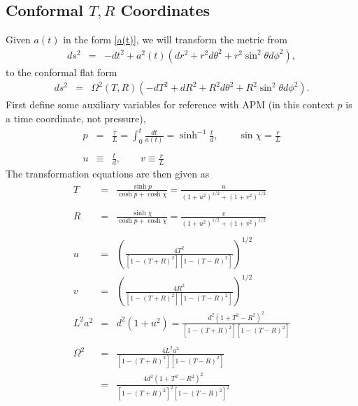 \documentclass[10pt,letterpaper]{article}
\numberwithin{equation}{section}
\begin{document}
\subsection{Conformal $T, R$ Coordinates}
Given $a(t)$ in the form \eqref{a(t)}, we will transform the metric from
\begin{eqnarray}
ds^2&=& -dt^2 + a^2(t)( dr^2 + r^2d\theta^2 + r^2\sin^2\theta d\phi^2),
\end{eqnarray}
to the conformal flat form
\begin{eqnarray}
ds^2&=& \Omega^2(T,R)( -dT^2+dR^2 + R^2d\theta^2 +R^2\sin^2\theta d\phi^2).
\end{eqnarray}
First define some auxiliary variables for reference with APM (in this context $p$ is a time coordinate, not pressure),
\begin{eqnarray}
p &=& \frac{\tau}{L} = \int_0^t \frac{dt}{a(t)} = \sinh^{-1}\frac{t}{d},\qquad \sin\chi = \frac{r}{L}
\\ \nonumber\\
u &\equiv& \frac{t}{d},\qquad v\equiv \frac{r}{L}
\end{eqnarray}
The transformation equations are then given as
\begin{eqnarray}
T &=& \frac{\sinh p}{\cosh p+\cosh \chi} = \frac{u}{(1+u^2)^{1/2}+(1+v^2)^{1/2}}
\\ \nonumber\\
R &=& \frac{\sinh \chi}{\cosh p + \cosh \chi} = \frac{v}{(1+u^2)^{1/2}+(1+v^2)^{1/2}}
\\ \nonumber\\
u &=& \left(\frac{4T^2}{[1-(T+R)^2][1-(T-R)^2]}\right)^{1/2}
\nonumber\\
v &=& \left(\frac{4R^2}{[1-(T+R)^2][1-(T-R)^2]}\right)^{1/2}
\nonumber\\
L^2 a^2 &=& d^2(1+u^2) = \frac{d^2(1+T^2-R^2)^2}{[1-(T+R)^2][1-(T-R)^2]}
\\ \nonumber\\
\Omega^2 &=& \frac{4 L^2 a^2}{[1-(T+R)^2][1-(T-R)^2]}
\nonumber\\
&=&  \frac{4d^2(1+T^2-R^2)^2}{[1-(T+R)^2]^2[1-(T-R)^2]^2}
\label{teq}
\end{eqnarray}
%
%
\\ \\
\end{document}
